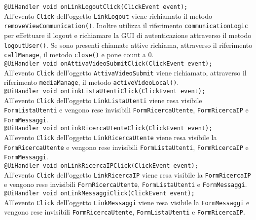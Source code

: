 {\begin{sloppypar}
{{\begin{itemize}
				\texttt{@UiHandler void onLinkLogoutClick(ClickEvent event);}\\
				All'evento \texttt{Click} dell'oggetto \texttt{LinkLogout} viene richiamato il metodo
				\texttt{removeViewCommunication()}. Inoltre utilizza il riferimento \texttt{communicationLogic} per 
				effettuare il logout e richiamare la GUI di autenticazione attraverso il metodo \texttt{logoutUser()}. 
				Se sono presenti chiamate attive richiama, attraverso il riferimento \texttt{callManage}, il metodo 
				\texttt{close()} e pone count a 0.\\

				\texttt{@UiHandler void onAttivaVideoSubmitClick(ClickEvent event);}\\
				All'evento \texttt{Click} dell'oggetto \texttt{AttivaVideoSubmit} viene richiamato, attraverso il riferimento 
				\texttt{mediaManage}, il metodo \texttt{activeVideoLocal()}.\\

				\texttt{@UiHandler void onLinkListaUtentiClick(ClickEvent event);}\\
				All'evento \texttt{Click} dell'oggetto \texttt{LinkListaUtenti} viene resa visibile \texttt{FormListaUtenti} e 
				vengono rese invisibili \texttt{FormRicercaUtente}, \texttt{FormRicercaIP} e \texttt{FormMessaggi}.\\

				\texttt{@UiHandler void onLinkRicercaUtenteClick(ClickEvent event);}\\
				All'evento \texttt{Click} dell'oggetto \texttt{LinkRicercaUtente} viene resa visibile la \texttt{FormRicercaUtente} 
				e vengono rese invisibili \texttt{FormListaUtenti}, \texttt{FormRicercaIP} e \texttt{FormMessaggi}.\\

				\texttt{@UiHandler void onLinkRicercaIPClick(ClickEvent event);}\\
				All'evento \texttt{Click} dell'oggetto \texttt{LinkRicercaIP} viene resa visibile la \texttt{FormRicercaIP} e 
				vengono rese invisibili \texttt{FormRicercaUtente}, \texttt{FormListaUtenti} e \texttt{FormMessaggi}.\\

				\texttt{@UiHandler void onLinkMessaggiClick(ClickEvent event);}\\
				All'evento \texttt{Click} dell'oggetto \texttt{LinkMessaggi} viene resa visibile la \texttt{FormMessaggi} e 
				vengono rese invisibili \texttt{FormRicercaUtente}, \texttt{FormListaUtenti} e \texttt{FormRicercaIP}.\\
				

\end{itemize}}}
\end{sloppypar}}
